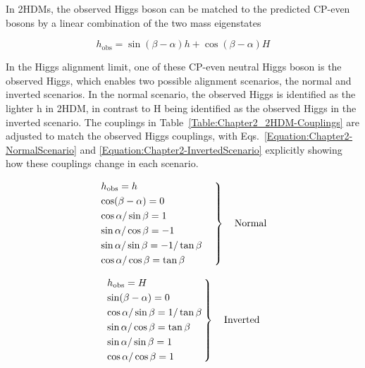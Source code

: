 In 2HDMs, the observed Higgs boson can be matched to the predicted CP-even bosons by a linear combination of the two mass eigenstates 

\begin{equation}
    h_{\text{obs}} = \sin{(\beta - \alpha)} h + \cos{(\beta - \alpha)} H 
\end{equation}

In the Higgs alignment limit, one of these CP-even neutral Higgs boson is the observed Higgs, which enables two possible alignment scenarios, the normal and inverted scenarios. In the normal scenario, the observed Higgs is identified as the lighter h in 2HDM, in contrast to H being identified as the observed Higgs in the inverted scenario. The couplings in Table~\ref{Table:Chapter2_2HDM-Couplings} are adjusted to match the observed Higgs couplings, with Eqs.~\ref{Equation:Chapter2-NormalScenario} and \ref{Equation:Chapter2-InvertedScenario} explicitly showing how these couplings change in each scenario.

\begin{equation}
\begin{rcases}
  h_{\text{obs}} = h \\
  \cos(\beta-\alpha) = 0 \\
  \cos\alpha/\sin\beta = 1 \\
  \sin\alpha/\cos\beta = -1 \\
  \sin\alpha/\sin\beta = -1/\tan\beta \\
  \cos\alpha/\cos\beta = \tan\beta
\quad \quad \quad\end{rcases}
\quad \text{Normal}
\label{Equation:Chapter2-NormalScenario}
\end{equation}

\begin{equation}
\begin{rcases}
  h_{\text{obs}} = H \\
  \sin(\beta-\alpha) = 0 \\
  \cos\alpha/\sin\beta = 1/\tan{\beta} \\
  \sin\alpha/\cos\beta = \tan{\beta} \\
  \sin\alpha/\sin\beta = 1 \\
  \cos\alpha/\cos\beta = 1
\quad \quad \quad \end{rcases}
\quad \text{Inverted}
\label{Equation:Chapter2-InvertedScenario}
\end{equation}












